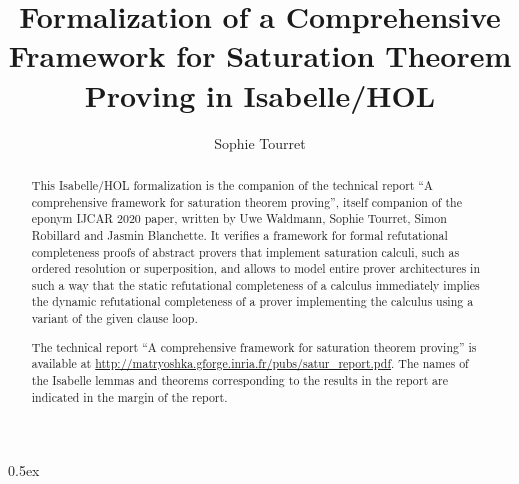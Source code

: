 \documentclass[11pt,a4paper]{article}
\begin{document}
\title{Formalization of a Comprehensive Framework for Saturation Theorem Proving in Isabelle/HOL}
\author{Sophie Tourret}
\maketitle

\begin{abstract}
This Isabelle/HOL formalization is the companion of the technical report ``A comprehensive framework for saturation theorem proving'', itself companion of the eponym IJCAR 2020 paper, written by Uwe Waldmann, Sophie Tourret, Simon Robillard and Jasmin Blanchette.
It verifies a framework for formal refutational completeness proofs of abstract provers that implement saturation calculi, such as ordered resolution or superposition, and allows to model entire prover architectures in such a way that the static refutational completeness of a calculus immediately implies the dynamic refutational completeness of a prover implementing the calculus using a variant of the given clause loop.

The technical report ``A comprehensive framework for saturation theorem proving'' is available at \url{http://matryoshka.gforge.inria.fr/pubs/satur\_report.pdf}.
The names of the Isabelle lemmas and theorems corresponding to the results in the report are indicated in the margin of the report.
\end{abstract}


\tableofcontents

\parindent 0pt\parskip 0.5ex



%
%
\end{document}
